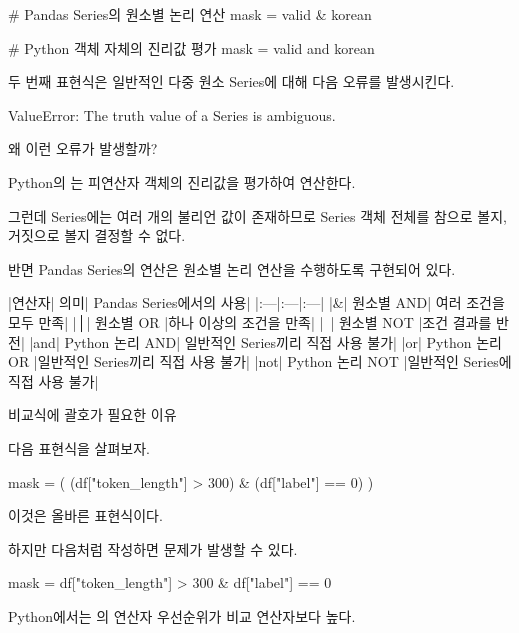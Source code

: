 \begin{dhkcode}
# Pandas Series의 원소별 논리 연산
mask = valid & korean

# Python 객체 자체의 진리값 평가
mask = valid and korean
\end{dhkcode}

두 번째 표현식은 일반적인 다중 원소 Series에 대해 다음 오류를 발생시킨다.

\begin{dhkzsh}
ValueError: The truth value of a Series is ambiguous.
\end{dhkzsh}

왜 이런 오류가 발생할까?

Python의 는 피연산자 객체의 진리값을 평가하여 연산한다.

그런데 Series에는 여러 개의 불리언 값이 존재하므로 Series 객체 전체를 참으로 볼지, 거짓으로 볼지 결정할 수 없다.

반면 Pandas Series의 \zsh{&} 연산은 원소별 논리 연산을 수행하도록 구현되어 있다.

\begin{dhktable}
|연산자|	의미|	Pandas Series에서의 사용|
|:---|:---|:---|
|&|	원소별 AND|	여러 조건을 모두 만족|
|│|	원소별 OR	|하나 이상의 조건을 만족|
|~|	원소별 NOT	|조건 결과를 반전|
|and|	Python 논리 AND|	일반적인 Series끼리 직접 사용 불가|
|or|	Python 논리 OR	|일반적인 Series끼리 직접 사용 불가|
|not|	Python 논리 NOT	|일반적인 Series에 직접 사용 불가|
\end{dhktable}

\begin{dhknote}
\begin{dhksmry}[centered]
비교식에 괄호가 필요한 이유
\end{dhksmry}
\end{dhknote}

다음 표현식을 살펴보자.

\begin{dhkcode}
mask = (
    (df["token_length"] > 300)
    & (df["label"] == 0)
)
\end{dhkcode}

이것은 올바른 표현식이다.

하지만 다음처럼 작성하면 문제가 발생할 수 있다.

\begin{dhkcode}
mask = df["token_length"] > 300 & df["label"] == 0
\end{dhkcode}

Python에서는 \zsh{&}의 연산자 우선순위가 비교 연산자보다 높다.

